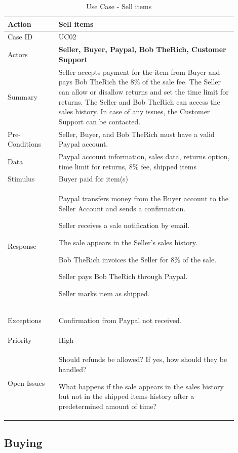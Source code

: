 \documentclass[11pt]{article}
\newcounter{use case ID}
\newcommand\tabularhead[1]{
    \begin{table}[ht]
        \addtocounter{use case ID}{1}
        \caption{Use Case \arabic{use case ID} - #1}
        \vspace{0.2cm}
        \begin{tabular}{|p{0.2\linewidth}|p{0.70\linewidth}|}
            \hline
            \textbf{Action} & \textbf{#1} \\
            \hline}
\newcommand\addrow[2]{#1 & #2\\ \hline}
\newcommand\addmulrow[2]{ \begin{minipage}[t][][t]{2.5cm}#1\end{minipage}
                &\begin{minipage}[t][][t]{11cm}
                    \begin{enumerate}[itemsep=-1ex] #2   \end{enumerate}
                \end{minipage}\vfill\\ \hline}
\newenvironment{usecase}{\tabularhead}
        {\hline\end{tabular}\end{table}}
\begin{document}
\begin{usecase}{Sell items}
    \addrow{Case ID}{UC02}
    \addrow{Actors}{\textbf{Seller, Buyer, Paypal, Bob TheRich, Customer Support}}
    \addrow{Summary}{Seller accepts payment for the item from Buyer and pays Bob TheRich the 8\% of the sale fee. The Seller can allow or disallow returns and set the time limit for returns. The Seller and Bob TheRich can access the sales history. In case of any issues, the Customer Support can be contacted.}
    \addrow{Pre-Conditions}{Seller, Buyer, and Bob TheRich must have a valid Paypal account. }
    \addrow{Data}{Paypal account information, sales data, returns option, time limit for returns, 8\% fee, shipped items}
    \addrow{Stimulus}{Buyer paid for item(s)}
    \addmulrow{Response}{
        \begin{itemize}{
            \item Paypal transfers money from the Buyer account to the Seller Account and sends a confirmation.
            \item Seller receives a sale notification by email.
            \item The sale appears in the Seller’s sales history.
            \item Bob TheRich invoices the Seller for 8\% of the sale. 
            \item Seller pays Bob TheRich through Paypal. 
            \item Seller marks item as shipped. }
        \end {itemize}}
    \addmulrow{Exceptions}{
        \begin{enumerate}{
            \item Confirmation from Paypal not received.
            } 
        \end{enumerate}}
    \addrow{Priority}{High}
    \addmulrow{Open Issues}{
        \begin{enumerate}{
                \item Should refunds be allowed? If yes, how should they be handled?
                \item What happens if the sale appears in the sales history but not in the shipped items history after a predetermined amount of time?
                } 
            \end{enumerate}}
\end{usecase}
\clearpage

\subsection{Buying}
\end{document}
